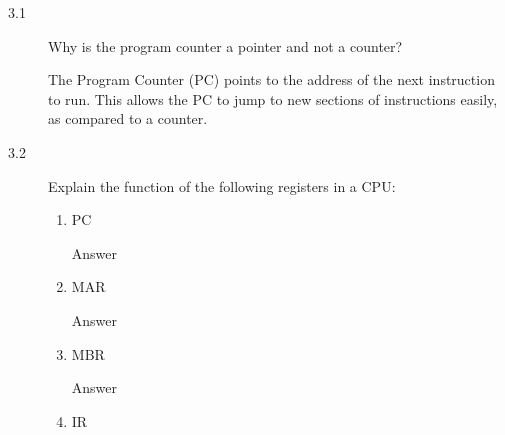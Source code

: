 \documentclass[letterpaper,10pt,titlepage]{article}
\begin{document}
\begin{description}
    \item[3.1] Why is the program counter a pointer and not a counter?
    
    The Program Counter (PC) points to the address of the next instruction to run. This allows the PC to jump to new sections of instructions easily, as compared to a counter.
    \item[3.2] Explain the function of the following registers in a CPU:
    \begin{enumerate}
        \item PC
        
        Answer
        \item MAR
        
        Answer
        \item MBR
        
        Answer
        \item IR
        

\end{enumerate}
\end{description}
\end{document}
